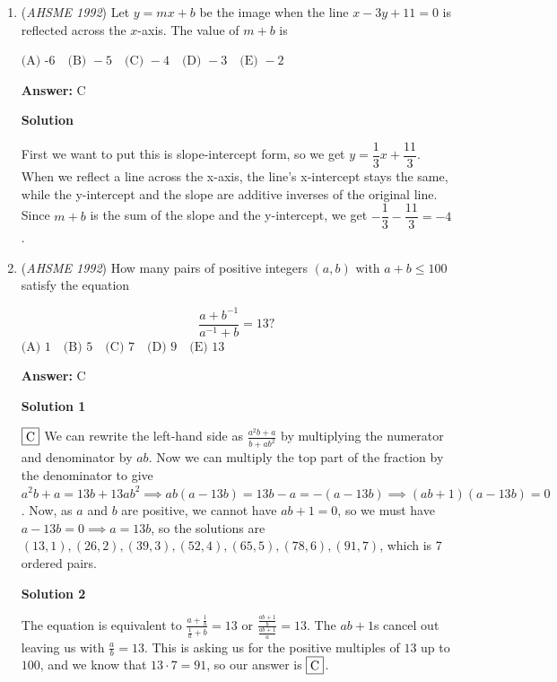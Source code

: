 \begin{enumerate}
 But they are asking for the larger circle radius, so 

 $3x= \fbox{18}$
$\fbox{B}$



	\item (\textit{AHSME 1992}) Let $y=mx+b$ be the image when the line $x-3y+11=0$ is reflected across the $x$-axis. The value of $m+b$ is


 $\text{(A) -6} \quad \text{(B) } -5\quad \text{(C) } -4\quad \text{(D) } -3\quad \text{(E) } -2$

 \textbf{Answer: }C



\textbf{Solution}

First we want to put this is slope-intercept form, so we get $y=\dfrac{1}{3}x+\dfrac{11}{3}$. When we reflect a line across the x-axis, the line's x-intercept stays the same, while the y-intercept and the slope are additive inverses of the original line. Since $m+b$ is the sum of the slope and the y-intercept, we get $-\dfrac{1}{3}-\dfrac{11}{3}=\boxed{-4}$.

 


	\item (\textit{AHSME 1992}) How many pairs of positive integers $(a,b)$ with $a+b\le 100$ satisfy the equation


 
 \[\frac{a+b^{-1}}{a^{-1}+b}=13?\]
$\text{(A) } 1\quad \text{(B) } 5\quad \text{(C) } 7\quad \text{(D) } 9\quad \text{(E) } 13$

 \textbf{Answer: }C



\textbf{Solution 1}

$\fbox{C}$ We can rewrite the left-hand side as $\frac{a^2b+a}{b+ab^2}$ by multiplying the numerator and denominator by $ab$. Now we can multiply the top part of the fraction by the denominator to give $a^2b+a = 13b + 13ab^2 \implies ab(a-13b)=13b-a = -(a-13b) \implies (ab+1)(a-13b) = 0$. Now, as $a$ and $b$ are positive, we cannot have $ab+1=0$, so we must have $a-13b=0 \implies a=13b$, so the solutions are $(13,1), (26,2), (39,3), (52,4), (65,5), (78,6), (91,7)$, which is 7 ordered pairs.

 



\textbf{Solution 2}

The equation is equivalent to $\frac{a+\frac{1}{b}}{\frac{1}{a}+b}=13$ or $\frac{\frac{ab+1}{b}}{\frac{ab+1}{a}}=13$. The $ab+1$s cancel out leaving us with $\frac{a}{b}=13$. This is asking us for the positive multiples of $13$ up to $100$, and we know that $13 \cdot 7 = 91$, so our answer is $\fbox{C}$.


\end{enumerate}
